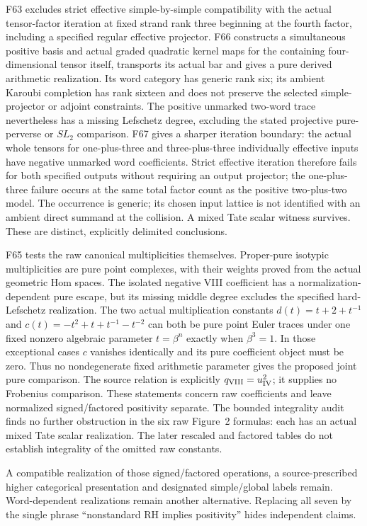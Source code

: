 \documentclass[11pt,a4paper]{article}
\theoremstyle{named}\newtheorem{finding}{Finding}[section]
\theoremstyle{definition}\newtheorem{definition}[finding]{Definition}
\theoremstyle{remark}\newtheorem{remark}[finding]{Remark}
\begin{document}
F63 excludes strict effective simple-by-simple compatibility with the actual tensor-factor iteration at fixed strand rank three beginning at the fourth factor, including a specified regular effective projector. F66 constructs a simultaneous positive basis and actual graded quadratic kernel maps for the containing four-dimensional tensor itself, transports its actual bar and gives a pure derived arithmetic realization. Its word category has generic rank six; its ambient Karoubi completion has rank sixteen and does not preserve the selected simple-projector or adjoint constraints. The positive unmarked two-word trace nevertheless has a missing Lefschetz degree, excluding the stated projective pure-perverse or $SL_2$ comparison. F67 gives a sharper iteration boundary: the actual whole tensors for one-plus-three and three-plus-three individually effective inputs have negative unmarked word coefficients. Strict effective iteration therefore fails for both specified outputs without requiring an output projector; the one-plus-three failure occurs at the same total factor count as the positive two-plus-two model. The occurrence is generic; its chosen input lattice is not identified with an ambient direct summand at the collision. A mixed Tate scalar witness survives. These are distinct, explicitly delimited conclusions.

F65 tests the raw canonical multiplicities themselves. Proper-pure isotypic multiplicities are pure point complexes, with their weights proved from the actual geometric Hom spaces. The isolated negative VIII coefficient has a normalization-dependent pure escape, but its missing middle degree excludes the specified hard-Lefschetz realization. The two actual multiplication constants $d(t)=t+2+t^{-1}$ and $c(t)=-t^2+t+t^{-1}-t^{-2}$ can both be pure point Euler traces under one fixed nonzero algebraic parameter $t=\beta^n$ exactly when $\beta^3=1$. In those exceptional cases $c$ vanishes identically and its pure coefficient object must be zero. Thus no nondegenerate fixed arithmetic parameter gives the proposed joint pure comparison. The source relation is explicitly $q_{\rm VIII}=u_{\rm IV}^2$; it supplies no Frobenius comparison. These statements concern raw coefficients and leave normalized signed/factored positivity separate. The bounded integrality audit finds no further obstruction in the six raw Figure~2 formulas: each has an actual mixed Tate scalar realization. The later rescaled and factored tables do not establish integrality of the omitted raw constants.

A compatible realization of those signed/factored operations, a source-prescribed higher categorical presentation and designated simple/global labels remain. Word-dependent realizations remain another alternative. Replacing all seven by the single phrase ``nonstandard RH implies positivity'' hides independent claims.
\end{document}
